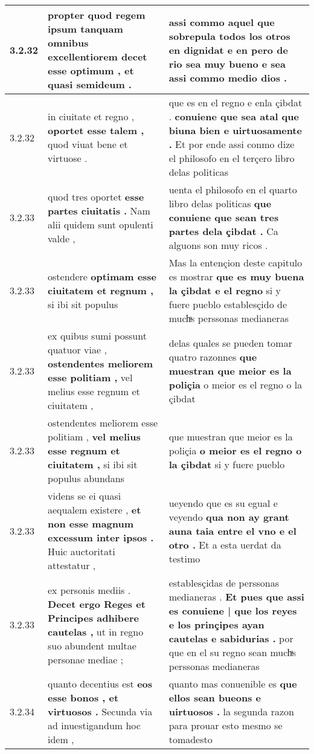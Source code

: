\begin{tabular}{|p{1cm}|p{6.5cm}|p{6.5cm}|}
3.2.32 & propter quod regem ipsum tanquam omnibus excellentiorem \textbf{ decet esse optimum , } et quasi semideum . & assi commo aquel que sobrepula todos los otros en dignidat \textbf{ e en pero de rio sea muy bueno } e sea assi commo medio dios . \\\hline
3.2.32 & in ciuitate et regno , \textbf{ oportet esse talem , } quod viuat bene et virtuose . & que es en el regno e enla çibdat . \textbf{ conuiene que sea atal que biuna bien e uirtuosamente . } Et por ende assi conmo dize el philosofo en el terçero libro delas politicas \\\hline
3.2.33 & quod tres oportet \textbf{ esse partes ciuitatis . } Nam alii quidem sunt opulenti valde , & uenta el philosofo en el quarto libro delas politicas \textbf{ que conuiene que sean tres partes dela çibdat . } Ca alguons son muy ricos . \\\hline
3.2.33 & ostendere \textbf{ optimam esse ciuitatem et regnum , } si ibi sit populus & Mas la entençion deste capitulo es mostrar \textbf{ que es muy buena la çibdat e el regno } si y fuere pueblo establesçido de muchͣs perssonas medianeras \\\hline
3.2.33 & ex quibus sumi possunt quatuor viae , \textbf{ ostendentes meliorem esse politiam , } vel melius esse regnum et ciuitatem , & delas quales se pueden tomar quatro razonnes \textbf{ que muestran que meior es la poliçia } o meior es el regno o la çibdat \\\hline
3.2.33 & ostendentes meliorem esse politiam , \textbf{ vel melius esse regnum et ciuitatem , } si ibi sit populus abundans & que muestran que meior es la poliçia \textbf{ o meior es el regno o la çibdat } si y fuere pueblo \\\hline
3.2.33 & videns se ei quasi aequalem existere , \textbf{ et non esse magnum excessum inter ipsos . } Huic auctoritati attestatur , & ueyendo que es su egual e veyendo \textbf{ qua non ay grant auna taia entre el vno e el otro . } Et a esta uerdat da testimo \\\hline
3.2.33 & ex personis mediis . \textbf{ Decet ergo Reges et Principes adhibere cautelas , } ut in regno suo abundent multae personae mediae ; & establesçidas de perssonas medianeras . \textbf{ Et pues que assi es conuiene | que los reyes e los prinçipes ayan cautelas e sabidurias . } por que en el su regno sean muchͣs perssonas medianeras \\\hline
3.2.34 & quanto decentius est \textbf{ eos esse bonos , et virtuosos . } Secunda via ad inuestigandum hoc idem , & quanto mas conuenible es \textbf{ que ellos sean bueons e uirtuosos . } la segunda razon para prouar esto mesmo se tomadesto \\\hline

\end{tabular}
